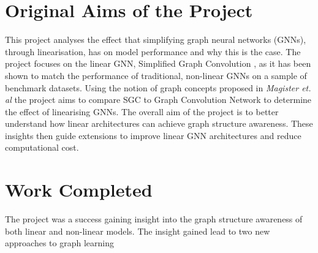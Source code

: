 \documentclass[12pt,a4paper,openany,openright]{report}
\begin{document}

\section*{Original Aims of the Project}

This project analyses the effect that simplifying graph neural networks (GNNs), through linearisation, has on model performance and why this is the case.
The project focuses on the linear GNN, Simplified Graph Convolution \cite{wu2019simplifying}, as it has been shown to match the performance of traditional, non-linear GNNs on a sample of benchmark datasets.
Using the notion of graph concepts proposed in \textit{Magister et. al} \cite{magister2021gcexplainer} the project aims to compare SGC to Graph Convolution Network to determine the effect of linearising GNNs.
The overall aim of the project is to better understand how linear architectures can achieve graph structure awareness.
These insights then guide extensions to improve linear GNN architectures and reduce computational cost.

\section*{Work Completed}

The project was a success gaining insight into the graph structure awareness of both linear and non-linear models.
The insight gained lead to two new approaches to graph learning
\end{document}
